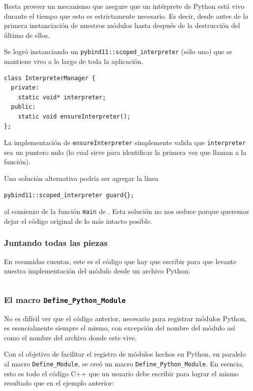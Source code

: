 \documentclass[]{article}
\begin{document}
Resta proveer un mecanismo que asegure que un intérprete de Python está vivo
durante el tiempo que esto es estrictamente necesario. Es decir, desde antes de
la primera instanciación de nuestros módulos hasta después de la destrucción
del último de ellos.

Se logró instanciando un \verb!pybind11::scoped_interpreter! (sólo uno) que se
mantiene vivo a lo largo de toda la aplicación.

\begin{verbatim}
class InterpreterManager {
  private:
    static void* interpreter;
  public:
    static void ensureInterpreter();
};
\end{verbatim}

La implementación de \verb!ensureInterpreter! simplemente valida que
\verb!interpreter! sea un puntero nulo (lo cual sirve para identificar la
primera vez que llaman a la función).

Una solución alternativa podría ser agregar la línea

\begin{verbatim}
pybind11::scoped_interpreter guard{};
\end{verbatim}

\noindent al comienzo de la función \verb!main! de \omnetpp{}.  Esta solución
no nos seduce porque queremos dejar el código original de \omnetpp{} lo más
intacto posible.

\subsubsection{Juntando todas las piezas}

En resumidas cuentas, este es el código que hay que escribir para que \omnetpp{}
levante nuestra implementación del módulo desde un archivo Python:

\inputminted{c++}{codelistings/omnetpy.cc}

\subsubsection{El macro \texttt{Define\_Python\_Module}}

No es difícil ver que el código anterior, necesario para registrar módulos
Python, es esencialmente siempre el mismo, con excepción del nombre del módulo
así como el nombre del archivo donde este vive.

Con el objetivo de facilitar el registro de módulos hechos en Python, en
paralelo al macro \verb!Define_Module!, se creó un macro
\verb!Define_Python_Module!. En esencia, esto es todo el código C++ que un
usuario debe escribir para lograr el mismo resultado que en el ejemplo
anterior:
\end{document}
